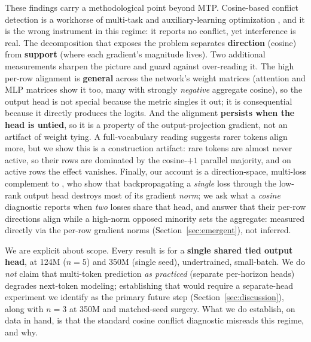 \documentclass{article}
\begin{document}
These findings carry a methodological point beyond MTP. Cosine-based conflict
detection is a workhorse of multi-task and auxiliary-learning optimization
\citep{yu2020pcgrad,wang2021gradvaccine,du2018auxsim}, and it is the wrong
instrument in this regime: it reports no conflict, yet interference is real. The
decomposition that exposes the problem separates \textbf{direction} (cosine) from
\textbf{support} (where each gradient's magnitude lives). Two additional
measurements sharpen the picture and guard against over-reading it. The high
per-row alignment is \textbf{general} across the network's weight matrices (attention and MLP matrices show it too, many with strongly \emph{negative}
aggregate cosine), so the output head is not special because the metric singles
it out; it is consequential because it directly produces the logits. And the
alignment \textbf{persists when the head is untied}, so it is a property of the
output-projection gradient, not an artifact of weight tying. A full-vocabulary
reading suggests rarer tokens align more, but we show this is a construction
artifact: rare tokens are almost never active, so their rows are dominated by
the cosine-$+1$ parallel majority, and on active rows the effect vanishes. Finally,
our account is a direction-space, multi-loss
complement to \citet{godey2026lmhead}, who show that backpropagating a
\emph{single} loss through the low-rank output head destroys most of its gradient
\emph{norm}; we ask what a \emph{cosine} diagnostic reports when \emph{two} losses
share that head, and answer that their per-row directions align while a high-norm
opposed minority sets the aggregate: measured directly via the per-row gradient
norms (Section~\ref{sec:emergent}), not inferred.

We are explicit about scope. Every result is for a \textbf{single shared tied
output head}, at 124M ($n{=}5$) and 350M (single seed), undertrained, small-batch.
We do \emph{not} claim that multi-token prediction \emph{as practiced} (separate
per-horizon heads) degrades next-token modeling; establishing that would require a
separate-head experiment we identify as the primary future step
(Section~\ref{sec:discussion}), along with $n{=}3$ at 350M and matched-seed
surgery. What we do establish, on data in hand, is that the standard cosine
conflict diagnostic misreads this regime, and why.
\end{document}
